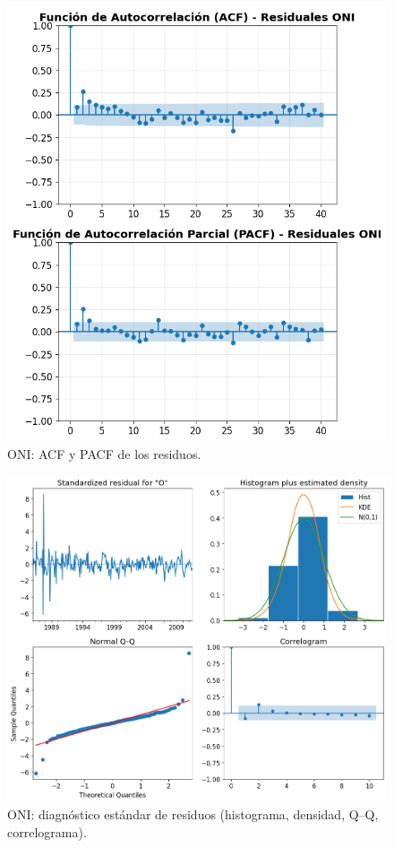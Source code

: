 \begin{figure}[H]\centering
\includegraphics[scale=.52]{Figures/acf_pacf_res_oni.png}
\caption{ONI: ACF y PACF de los residuos.}
\label{fig:acf_pacf_res_oni}
\end{figure}

\begin{figure}[H]\centering
\includegraphics[scale=.52]{Figures/res_std_oni.png}
\caption{ONI: diagnóstico estándar de residuos (histograma, densidad, Q--Q, correlograma).}
\label{fig:std_oni}
\end{figure}

